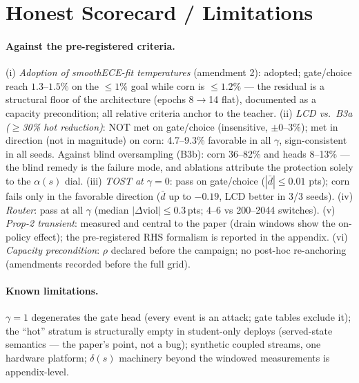 \documentclass[sigconf,nonacm]{acmart}
\newcommand{\delt}{\delta}
\begin{document}
\section{Honest Scorecard / Limitations}
\label{sec:limits}
\paragraph{Against the pre-registered criteria.}
(i) \emph{Adoption of smoothECE-fit temperatures} (amendment 2): adopted;
gate/choice reach $1.3$--$1.5\%$ on the $\le1\%$ goal while corn is
$\le1.2\%$ — the residual is a structural floor of the architecture
(epochs 8$\to$14 flat), documented as a capacity precondition; all
relative criteria anchor to the teacher.
(ii) \emph{LCD vs.\ B3a ($\ge$30\% hot reduction)}: NOT met on
gate/choice (insensitive, $\pm$0--3\%); met in direction (not in
magnitude) on corn: 4.7--9.3\% favorable in all $\gamma$, sign-consistent
in all seeds. Against blind oversampling (B3b): corn 36--82\% and heads
8--13\% — the blind remedy is the failure mode, and ablations attribute
the protection solely to the $\alpha(s)$ dial.
(iii) \emph{TOST at $\gamma{=}0$}: pass on gate/choice ($|\bar d| \le
0.01$ pts); corn fails only in the favorable direction ($\bar d$ up to
$-0.19$, LCD better in 3/3 seeds).
(iv) \emph{Router}: pass at all $\gamma$ (median $|\Delta$viol$| \le
0.3$\,pts; $4$--6 vs 200--2044 switches).
(v) \emph{Prop-2 transient}: measured and central to the paper (drain
windows show the on-policy effect); the pre-registered RHS formalism is
reported in the appendix.
(vi) \emph{Capacity precondition}: $\rho$ declared before the campaign;
no post-hoc re-anchoring (amendments recorded before the full grid).

\begin{table}[t]
\centering\footnotesize

\caption{Scorecard against the pre-registered success criteria
(\texttt{PRE-REGISTRATION.md} §5). Failed criteria are reported as
honest negatives with their direction; no criterion was re-defined
after seeing the full grid.}
\label{tab:scorecard}
\end{table}
\paragraph{Known limitations.} $\gamma{=}1$ degenerates the gate head
(every event is an attack; gate tables exclude it); the ``hot'' stratum
is structurally empty in student-only deploys (served-state semantics —
the paper's point, not a bug); synthetic coupled streams, one hardware
platform; $\delt(s)$ machinery beyond the windowed measurements is
appendix-level.
\end{document}
